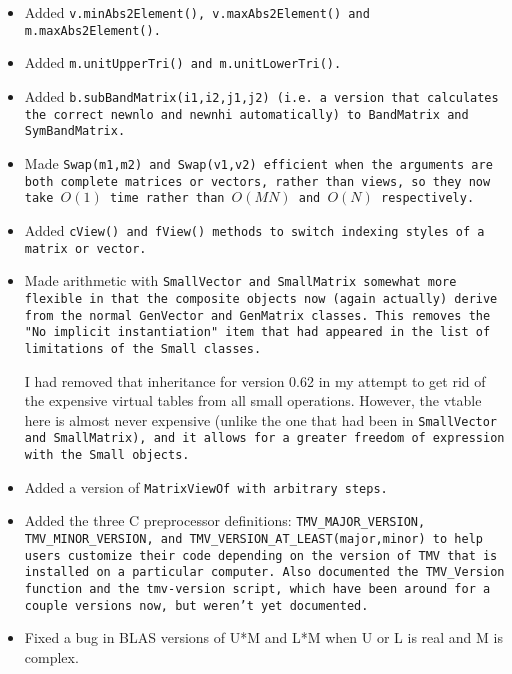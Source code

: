 \begin{description}
\begin{itemize}
\item Added \tt{v.minAbs2Element()}, \tt{v.maxAbs2Element()} and \tt{m.maxAbs2Element()}.

\item Added \tt{m.unitUpperTri()} and \tt{m.unitLowerTri()}.

\item Added \tt{b.subBandMatrix(i1,i2,j1,j2)} (i.e. a version that calculates the correct 
\tt{newnlo} and \tt{newnhi} automatically) to \tt{BandMatrix} and \tt{SymBandMatrix}.

\item Made \tt{Swap(m1,m2)} and \tt{Swap(v1,v2)} efficient when the arguments are both
complete matrices or vectors, rather than views, so they now take $O(1)$ time rather than
$O(MN)$ and $O(N)$ respectively.

\item Added \tt{cView()} and \tt{fView()} methods to switch indexing styles of a matrix or vector.

\item Made arithmetic with \tt{SmallVector} and \tt{SmallMatrix} somewhat more flexible in that
the composite objects now (again actually) derive from the normal \tt{GenVector} and
\tt{GenMatrix} classes.  This removes the "No implicit instantiation" item that had appeared
in the list of limitations of the \tt{Small} classes.

I had removed that inheritance for version 0.62 in my attempt to get rid of the expensive virtual
tables from all small operations.  However, the vtable here is almost never expensive 
(unlike the one that had been in \tt{SmallVector} and \tt{SmallMatrix}), and
it allows for a greater freedom of expression with the \tt{Small} objects.

\item Added a version of \tt{MatrixViewOf} with arbitrary steps.

\item Added the three C preprocessor definitions: \tt{TMV\_MAJOR\_VERSION}, 
\tt{TMV\_MINOR\_VERSION},
and \tt{TMV\_VERSION\_AT\_LEAST(major,minor)} to help users customize
their code depending on the version of TMV that is installed on a particular
computer.  Also documented the \tt{TMV\_Version} function and the \tt{tmv-version}
script, which have been around
for a couple versions now, but weren't yet documented.

\item Fixed a bug in BLAS versions of U*M and L*M when U or L is real and
M is complex.


\end{itemize}
\end{description}
